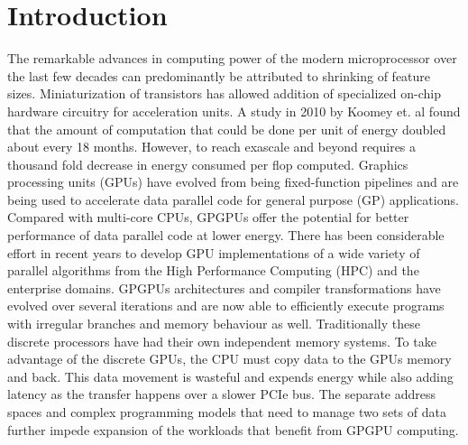 \chapter{Introduction}
\label{chap:introduction}




\par The remarkable advances in computing power of the modern microprocessor over the last few decades can predominantly be attributed to shrinking of feature sizes. Miniaturization of transistors has allowed addition of specialized on-chip hardware circuitry for acceleration units. 
A study in 2010 by Koomey et. al \cite{koomey} found that the amount of computation that could be done per unit of energy doubled about every 18 months. However, to reach exascale and beyond requires a thousand fold decrease in energy consumed per flop computed.
Graphics processing units (GPUs) have evolved from being fixed-function pipelines and are being used to accelerate data parallel code for general purpose (GP) applications. Compared with multi-core CPUs, GPGPUs offer the potential for better performance of data parallel code at lower energy. 
There has been considerable effort in recent years to develop GPU implementations of a wide variety of parallel algorithms from the High Performance Computing (HPC) and the enterprise domains. GPGPUs architectures and compiler transformations have evolved over several iterations and are now able to efficiently execute programs with irregular branches and memory behaviour as well. 
Traditionally these discrete processors have had their own independent memory systems. To take advantage of the discrete GPUs, the CPU must copy data to the GPUs memory and back. This data movement is wasteful and expends energy while also adding latency as the transfer happens over a slower PCIe bus. The separate address spaces and complex programming models that need to manage two sets of data further impede expansion of the workloads that benefit from GPGPU computing. 

